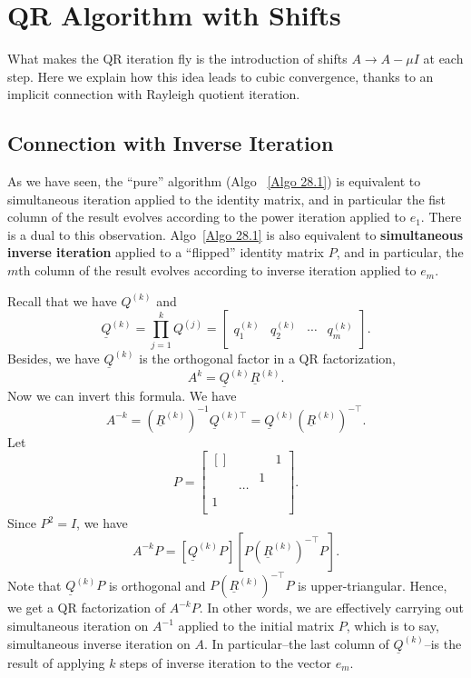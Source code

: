 \chapter{QR Algorithm with Shifts} 

What makes the QR iteration fly is the introduction of shifts $A\to A-\mu I$ at each step. Here we explain how this idea leads to cubic convergence, thanks to an implicit connection with Rayleigh quotient iteration.  

\section{Connection with Inverse Iteration} 
As we have seen, the ``pure'' algorithm (Algo ~\ref{Algo 28.1}) is equivalent to simultaneous iteration applied to the identity matrix, and in particular the fist column of the result evolves according to the power iteration applied to $ e_1 $. There is a dual to this observation. Algo~\ref{Algo 28.1} is also equivalent to \textbf{simultaneous inverse iteration} applied to a ``flipped'' identity matrix $P$, and in particular, the $ m $th column of the result evolves according to inverse iteration applied to $ e_m $.  

Recall that we have $Q^{(k)}$ and 
\[
    \underline Q^{(k)} = \prod_{j=1}^{k} Q^{(j)} = \left[ \begin{array}{c|c|c|c}
        & & & \\ 
        q_1^{(k)} & q_2 ^{(k)} & \cdots & q_m^{(k)}\\ 
        & & & 
    \end{array} \right]. 
\]
Besides, we have $\underline Q^{(k)}$ is the orthogonal factor in a QR factorization, 
\[
    A^{k} = \underline Q^{(k)} \underline R^{(k)}. 
\]
Now we can invert this formula. We have 
\[
    A^{-k} = \left( \underline{R}^{(k)} \right) ^{-1} \underline{Q}^{(k)\top} = \underline{Q}^{(k)}\left( \underline{R}^{(k)} \right) ^{-\top}. 
\]
Let 
\[
    P = \begin{bmatrix}[] 
         &  &  &  1 \\
         &  & 1 &   \\
         & \cdots &  &   \\
        1 &  &  &   \\
    \end{bmatrix}.  
\]
Since $P^{2} =I$, we have 
\[
    A^{-k}P = [ \underline{Q}^{(k)}P] [P( \underline{R}^{(k)})^{-\top}P]. 
\]
Note that $\underline{Q}^{(k)}P$ is orthogonal and $ P(\underline{R}^{(k)}) ^{-\top}P $ is upper-triangular.  Hence, we get a QR factorization of $ A^{-k}P $.  In other words, we are effectively carrying out simultaneous iteration on $A^{-1} $ applied to the initial matrix $ P $, which is to say, simultaneous inverse iteration on $ A $. In particular--the last column of $ \underline{Q}^{(k)} $--is the result of applying $ k $ steps of inverse iteration to the vector $ e_m $. 

